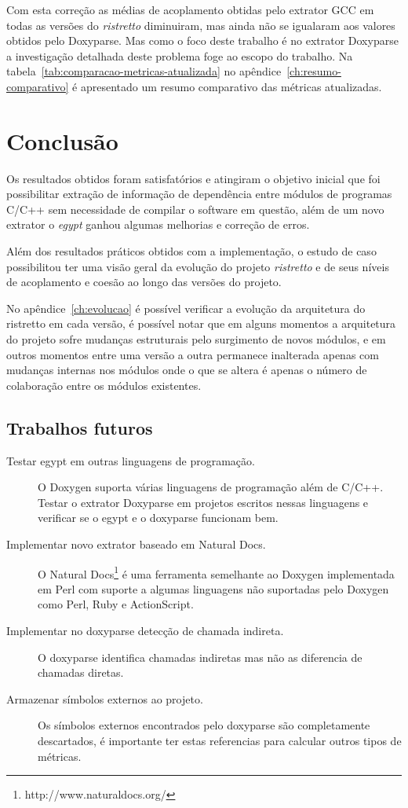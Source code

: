 Com esta correção as médias de acoplamento obtidas pelo extrator GCC em todas
as versões do {\it ristretto} diminuiram, mas ainda não se igualaram aos
valores obtidos pelo Doxyparse. Mas como o foco deste trabalho é no extrator
Doxyparse a investigação detalhada deste problema foge ao escopo do trabalho.
Na tabela~\ref{tab:comparacao-metricas-atualizada} no
apêndice~\ref{ch:resumo-comparativo} é apresentado um resumo comparativo das
métricas atualizadas.

\chapter{Conclusão} \label{ch:conclusao}

Os resultados obtidos foram satisfatórios e atingiram o objetivo inicial que
foi possibilitar extração de informação de dependência entre módulos de
programas C/C++ sem necessidade de compilar o software em questão, além de um
novo extrator o {\it egypt} ganhou algumas melhorias e correção de erros.

Além dos resultados práticos obtidos com a implementação, o estudo de caso
possibilitou ter uma visão geral da evolução do projeto {\it ristretto} e de
seus níveis de acoplamento e coesão ao longo das versões do projeto.

No apêndice~\ref{ch:evolucao} é possível verificar a evolução da arquitetura do
ristretto em cada versão, é possível notar que em alguns momentos a arquitetura
do projeto sofre mudanças estruturais pelo surgimento de novos módulos, e em
outros momentos entre uma versão a outra permanece inalterada apenas com
mudanças internas nos módulos onde o que se altera é apenas o número de
colaboração entre os módulos existentes.

\section{Trabalhos futuros}

\begin{description}

\item[Testar egypt em outras linguagens de programação.]
O Doxygen suporta várias linguagens de programação além de C/C++. Testar o
extrator Doxyparse em projetos escritos nessas linguagens e verificar se o
egypt e o doxyparse funcionam bem.

\item[Implementar novo extrator baseado em Natural Docs.]
O Natural Docs\footnote{http://www.naturaldocs.org/} é uma ferramenta
semelhante ao Doxygen implementada em Perl com suporte a algumas linguagens não
suportadas pelo Doxygen como Perl, Ruby e ActionScript.

\item[Implementar no doxyparse detecção de chamada indireta.]
O doxyparse identifica chamadas indiretas mas não as diferencia de chamadas
diretas.

\item[Armazenar símbolos externos ao projeto.]
Os símbolos externos encontrados pelo doxyparse são completamente descartados,
é importante ter estas referencias para calcular outros tipos de métricas.

\end{description}
